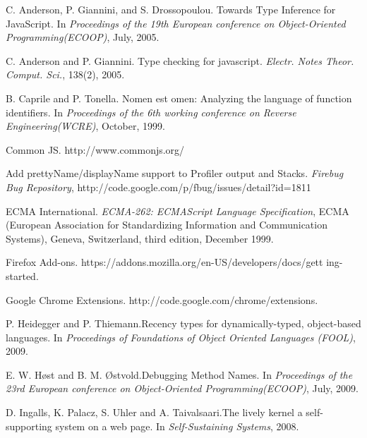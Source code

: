 \documentclass[10pt, preprint]{sigplanconf}
\begin{document}
\begin{thebibliography}{}
\softraggedright


C. Anderson, P. Giannini, and S. Drossopoulou. \newblock Towards Type Inference for JavaScript.
\newblock In \emph{Proceedings of the 19th European conference on Object-Oriented Programming(ECOOP)},
July, 2005.

C. Anderson and P. Giannini. \newblock Type checking for javascript.
\newblock \emph{Electr. Notes Theor. Comput. Sci.}, 138(2), 2005. 

B. Caprile and P. Tonella. \newblock Nomen est omen: Analyzing the language of function identifiers.
\newblock In \emph{Proceedings of the 6th working conference on Reverse Engineering(WCRE)},
October, 1999.

Common JS.
\newblock http://www.commonjs.org/

Add prettyName/displayName support to Profiler output and Stacks.
\newblock \emph{Firebug Bug Repository},
\newblock http://code.google.com/p/fbug/issues/detail?id=1811

ECMA International.
\newblock \emph{ECMA-262: ECMAScript Language Specification},
ECMA (European Association for Standardizing Information
and Communication Systems), Geneva, Switzerland, third edition,
December 1999. 

Firefox Add-ons.
\newblock https://addons.mozilla.org/en-US/developers/docs/gett ing-started.

Google Chrome Extensions.
\newblock http://code.google.com/chrome/extensions.

P. Heidegger and P. Thiemann.\newblock Recency types for dynamically-typed, object-based languages.
\newblock In \emph{Proceedings of Foundations of Object Oriented Languages (FOOL)},
2009.

E. W. H{\o}st and  B. M. {\O}stvold.\newblock Debugging Method Names.
\newblock In \emph{Proceedings of the 23rd European conference on Object-Oriented Programming(ECOOP)},
July, 2009.

D. Ingalls, K. Palacz, S. Uhler and A. Taivalsaari.\newblock The lively kernel a self-supporting system on
a web page.
\newblock In \emph{Self-Sustaining Systems},
2008.


\end{thebibliography}
\end{document}
